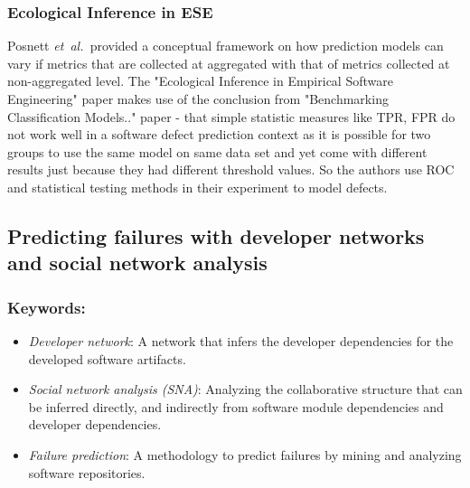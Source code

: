 \documentclass{sig-alternate-05-2015}
\newcommand{\etal}{\mbox{\emph{et al.\ }}}
\begin{document}
\subsubsection{Ecological Inference in ESE}
Posnett \etal provided a conceptual framework on how prediction models can vary if metrics that are collected at aggregated with that of metrics collected at non-aggregated level. The "Ecological Inference in Empirical Software Engineering" paper makes use of the conclusion from "Benchmarking Classification Models.." paper - that simple statistic measures like TPR, FPR do not work well in a software defect prediction context as it is possible for two groups to use the same model on same data set and yet come with different results just because they had different threshold values. So the authors use ROC and statistical testing methods in their experiment to model defects.

\subsection{Predicting failures with developer networks and social network analysis \cite{Meneely:2008}}

\subsubsection{Keywords:}
\begin{itemize}
\item \emph{Developer network}: A network that infers the developer dependencies for the developed software artifacts.
\item \emph{Social network analysis (SNA)}: Analyzing the collaborative structure that can be inferred directly, and indirectly from software module dependencies and developer dependencies.
\item \emph{Failure prediction}: A methodology to predict failures by mining and analyzing software repositories.
\end{itemize} 
\end{document}
